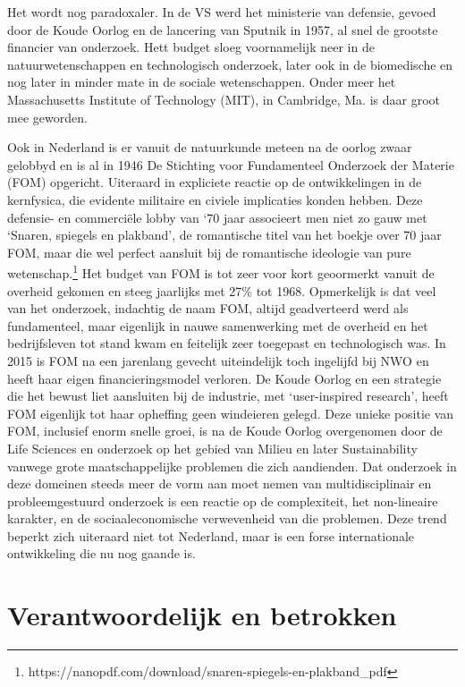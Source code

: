 \documentclass{jote-book}
\begin{document}
	Het wordt nog paradoxaler. In de VS werd het ministerie van defensie, gevoed door de Koude Oorlog en de lancering van Sputnik in 1957, al snel de grootste financier van onderzoek. Hett budget sloeg voornamelijk neer in de natuurwetenschappen en technologisch onderzoek, later ook in de biomedische en nog later in minder mate in de sociale wetenschappen. Onder meer het Massachusetts Institute of Technology (MIT), in Cambridge, Ma. is daar groot mee geworden.



	Ook in Nederland is er vanuit de natuurkunde meteen na de oorlog zwaar gelobbyd en is al in 1946 De Stichting voor Fundamenteel Onderzoek der Materie (FOM) opgericht. Uiteraard in expliciete reactie op de ontwikkelingen in de kernfysica, die evidente militaire en civiele implicaties konden hebben. Deze defensie- en commerciële lobby van ‘70 jaar associeert men niet zo gauw met ‘Snaren, spiegels en plakband', de romantische titel van het boekje over 70 jaar FOM, maar die wel perfect aansluit bij de romantische ideologie van pure wetenschap.\footnote{https://nanopdf.com/download/snaren-spiegels-en-plakband\_pdf} Het budget van FOM is tot zeer voor kort geoormerkt vanuit de overheid gekomen en steeg jaarlijks met 27\% tot 1968. Opmerkelijk is dat veel van het onderzoek, indachtig de naam FOM, altijd geadverteerd werd als fundamenteel, maar eigenlijk in nauwe samenwerking met de overheid en het bedrijfsleven tot stand kwam en feitelijk zeer toegepast en technologisch was. In 2015 is FOM na een jarenlang gevecht uiteindelijk toch ingelijfd bij NWO en heeft haar eigen financieringsmodel verloren. De Koude Oorlog en een strategie die het bewust liet aansluiten bij de industrie, met ‘user-inspired research', heeft FOM eigenlijk tot haar opheffing geen windeieren gelegd. Deze unieke positie van FOM, inclusief enorm snelle groei, is na de Koude Oorlog overgenomen door de Life Sciences en onderzoek op het gebied van Milieu en later Sustainability vanwege grote maatschappelijke problemen die zich aandienden. Dat onderzoek in deze domeinen steeds meer de vorm aan moet nemen van multidisciplinair en probleemgestuurd onderzoek is een reactie op de complexiteit, het non-lineaire karakter, en de sociaaleconomische verwevenheid van die problemen. Deze trend beperkt zich uiteraard niet tot Nederland, maar is een forse internationale ontwikkeling die nu nog gaande is.



	\section{Verantwoordelijk en betrokken}
\end{document}
